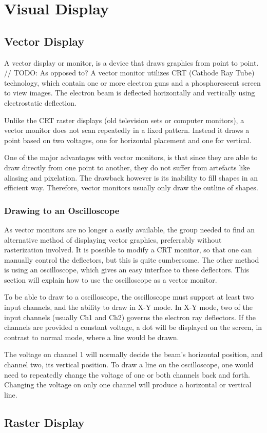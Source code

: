 \section{Visual Display}

\subsection{Vector Display}
A vector display or monitor, is a device that draws graphics from point to point.
// TODO: As opposed to?
A vector monitor utilizes CRT (Cathode Ray Tube) technology, which contain one or more electron guns and a phosphorescent screen to view images.
The electron beam is deflected horizontally and vertically using electrostatic deflection. \cite{vector-monitor}

Unlike the CRT raster displays (old television sets or computer monitors), a vector monitor does not scan repeatedly in a fixed pattern.
Instead it draws a point based on two voltages, one for horizontal placement and one for vertical.

One of the major advantages with vector monitors,
is that since they are able to draw directly from one point to another,
they do not suffer from artefacts like aliasing and pixelation.
The drawback however is its inability to fill shapes in an efficient way.
Therefore, vector monitors usually only draw the outline of shapes.

\subsubsection{Drawing to an Oscilloscope}
As vector monitors are no longer a easily available, the group needed to find an alternative method of displaying vector graphics, preferrably without rasterization involved.
It is possible to modify a CRT monitor, so that one can manually control the deflectors, but this is quite cumbersome.
The other method is using an oscilloscope, which gives an easy interface to these deflectors.
This section will explain how to use the oscilloscope as a vector monitor.


To be able to draw to a oscilloscope, the oscilloscope must support at least two input channels, and the ability to draw in X-Y mode.
In X-Y mode, two of the input channels (usually Ch1 and Ch2) governs the electron ray deflectors.
If the channels are provided a constant voltage, a dot will be displayed on the screen, in contrast to normal mode, where  a line would be drawn.

The voltage on channel 1 will normally decide the beam's horizontal position, and channel two, its vertical position.
To draw a line on the oscilloscope, one would need to repeatedly change the voltage of one or both channels back and forth.
Changing the voltage on only one channel will produce a horizontal or vertical line.

\subsection{Raster Display}
